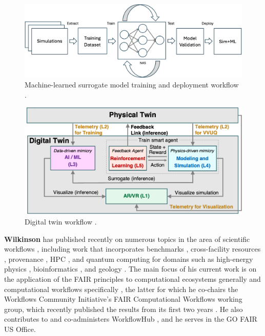 \begin{figure}
    \centering
    \includegraphics[width=0.8\linewidth]{images/workflow-surrogate-model.png}
    \caption{Machine-learned surrogate model training and deployment workflow \cite{brewer2023entropy}.}
    \label{fig:surrogate}
\end{figure}

\begin{figure}
    \centering
    \includegraphics[width=0.8\linewidth]{images/workflow-digital-twin.png}
    \caption{Digital twin workflow \cite{brewer2024digital}.}
    \label{fig:dt}
\end{figure}

{\bf Wilkinson} has published recently on numerous topics in the area of scientific workflows \citep{ferreira_da_silva2024, ferreira_da_silva2022, badia2024integrating}, including work that incorporates benchmarks \citep{coleman2022-2}, cross-facility resources \citep{antypas2021}, provenance \citep{souza2023}, HPC \citep{wilkinson2022-2}, and quantum computing \citep{bieberich2023} for domains such as high-energy physics \citep{ananthraj2018}, bioinformatics \citep{lee2021,wilson2021}, and geology \citep{mcclure2020}. The main focus of his current work is on the application of the FAIR principles to computational ecosystems generally and computational workflows specifically \citep{wilkinson2022, caw2021-report}, the latter for which he co-chairs the Workflows Community Initiative's FAIR Computational Workflows working group, which recently published the results from its first two years \citep{wilkinson2025}. He also contributes to and co-administers WorkflowHub \citep{gustafsson2024}, and he serves in the GO FAIR US Office.

